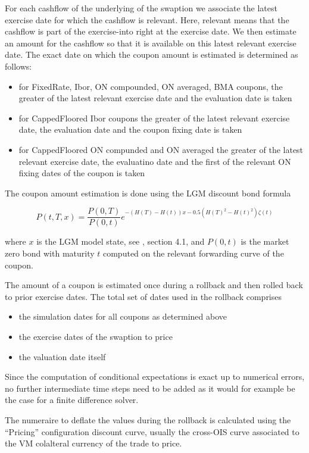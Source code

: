 For each cashflow of the underlying of the swaption we associate the latest exercise date for which the cashflow is
relevant. Here, relevant means that the cashflow is part of the exercise-into right at the exercise date. We then
estimate an amount for the cashflow so that it is available on this latest relevant exercise date. The exact date on
which the coupon amount is estimated is determined as follows:

\begin{itemize}
  \item for FixedRate, Ibor, ON compounded, ON averaged, BMA coupons, the greater of the latest relevant exercise date
    and the evaluation date is taken
  \item for CappedFloored Ibor coupons the greater of the latest relevant exercise date, the evaluation date and the coupon fixing date is taken
  \item for CappedFloored ON compunded and ON averaged the greater of the latest relevant exercise date, the evaluatino
    date and the first of the relevant ON fixing dates of the coupon is taken
\end{itemize}

The coupon amount estimation is done using the LGM discount bond formula

\begin{equation}
P(t,T,x) = \frac{P(0,T)}{P(0,t)} e^{ -(H(T)-H(t))x - 0.5 ( H(T)^2 - H(t)^2 ) \zeta(t)}
\end{equation}

where $x$ is the LGM model state, see \cite{Hagan_LGM}, section 4.1, and $P(0,t)$ is the market zero bond with maturity
$t$ computed on the relevant forwarding curve of the coupon.

The amount of a coupon is estimated once during a rollback and then rolled back to prior exercise dates. The total set of dates used in the rollback comprises

\begin{itemize}
\item the simulation dates for all coupons as determined above
\item the exercise dates of the swaption to price
\item the valuation date itself
\end{itemize}

Since the computation of conditional expectations is exact up to numerical errors, no further intermediate time steps
need to be added as it would for example be the case for a finite difference solver.

The numeraire to deflate the values during the rollback is calculated using the ``Pricing'' configuration discount
curve, usually the cross-OIS curve associated to the VM colalteral currency of the trade to price.
